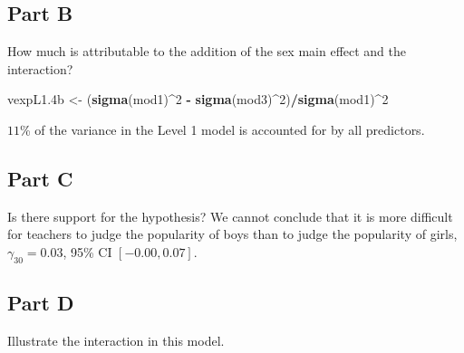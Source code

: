 \documentclass[]{article}
\newenvironment{Shaded}{\begin{snugshade}}{\end{snugshade}}
\newcommand{\KeywordTok}[1]{\textcolor[rgb]{0.13,0.29,0.53}{\textbf{#1}}}
\newcommand{\DecValTok}[1]{\textcolor[rgb]{0.00,0.00,0.81}{#1}}
\newcommand{\StringTok}[1]{\textcolor[rgb]{0.31,0.60,0.02}{#1}}
\newcommand{\OperatorTok}[1]{\textcolor[rgb]{0.81,0.36,0.00}{\textbf{#1}}}
\newcommand{\NormalTok}[1]{#1}
\begin{document}
\subsection{Part B}\label{part-b-3}

How much is attributable to the addition of the sex main effect and the
interaction?

\begin{Shaded}
\begin{Highlighting}[]
\NormalTok{vexpL1.4b <-}\StringTok{ }\NormalTok{(}\KeywordTok{sigma}\NormalTok{(mod1)}\OperatorTok{^}\DecValTok{2} \OperatorTok{-}\StringTok{ }\KeywordTok{sigma}\NormalTok{(mod3)}\OperatorTok{^}\DecValTok{2}\NormalTok{)}\OperatorTok{/}\KeywordTok{sigma}\NormalTok{(mod1)}\OperatorTok{^}\DecValTok{2}
\end{Highlighting}
\end{Shaded}

\(11\)\% of the variance in the Level 1 model is accounted for by all
predictors.

\subsection{Part C}\label{part-c-2}

Is there support for the hypothesis? We cannot conclude that it is more
difficult for teachers to judge the popularity of boys than to judge the
popularity of girls, \(\gamma_{30} = 0.03\), 95\% CI \([-0.00, 0.07]\).

\subsection{Part D}\label{part-d-2}

Illustrate the interaction in this model.
\end{document}
